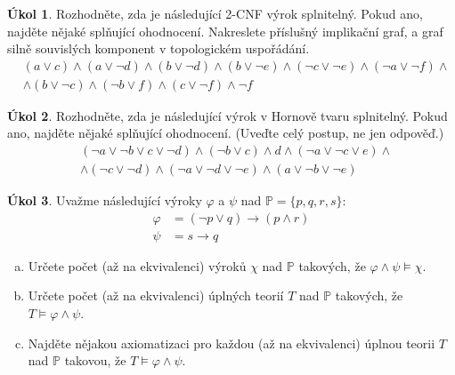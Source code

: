\documentclass[a4paper]{amsart}
\theoremstyle{definition}
\newtheorem{task}{Úkol}
\begin{document}
\begin{task}
Rozhodněte, zda je následující 2-CNF výrok splnitelný. Pokud ano, najděte nějaké splňující ohodnocení. Nakreslete příslušný implikační graf, a graf silně souvislých komponent v topologickém uspořádání.
\begin{align*}
&(a \vee  c) \wedge  (a \vee  \neg d) \wedge  (b \vee  \neg d) 
\wedge  (b \vee  \neg e) \wedge  (\neg c \vee  \neg e) 
\wedge  (\neg a \vee  \neg f)
\wedge \\ &\wedge (b\vee\neg c)\wedge
(\neg b \vee  f) \wedge  (c \vee  \neg f) \wedge \neg f
\end{align*}
\end{task}

\begin{task}
Rozhodněte, zda je následující výrok v Hornově tvaru splnitelný. Pokud ano, najděte nějaké splňující ohodnocení. (Uveďte celý postup, ne jen odpověď.)
\begin{align*}
&(\neg a \vee \neg b \vee c \vee \neg d)\wedge(\neg b \vee c)\wedge d \wedge (\neg a \vee \neg c \vee e)\wedge \\
&\wedge(\neg c \vee \neg d)\wedge(\neg a \vee \neg d \vee \neg e)\wedge(a\vee \neg b \vee\neg e)
\end{align*}
\end{task}

\begin{task}
Uvažme následující výroky $\varphi$ a $\psi$ nad $\mathbb P=\{p, q, r, s\}$:
\begin{align*}
    \varphi &= (\neg p \vee  q)\to(p\wedge r)\\
    \psi &= s\to q
\end{align*}
\begin{enumerate}[(a)]
    \item Určete počet (až na ekvivalenci) výroků $\chi$ nad $\mathbb P$ takových, že $\varphi\wedge\psi\models\chi$.
    \item Určete počet (až na ekvivalenci) úplných teorií $T$ nad $\mathbb P$ takových, že $T\models\varphi\wedge\psi$.
    \item Najděte nějakou axiomatizaci pro každou (až na ekvivalenci) úplnou teorii $T$ nad $\mathbb P$ takovou, že $T\models\varphi\wedge\psi$.
\end{enumerate}


\end{task}
\end{document}
